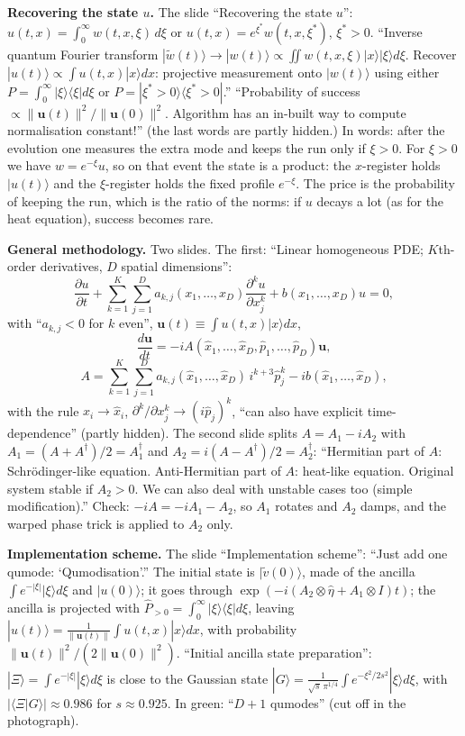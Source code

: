 \medskip\noindent
{\bf Recovering the state $u$.}
The slide ``Recovering the state $u$'':
$u(t,x)=\int_0^\infty w(t,x,\xi)\,d\xi$ or
$u(t,x)=e^{\xi^*}w(t,x,\xi^*)$, $\xi^*>0$.
``Inverse quantum Fourier transform
$|\tilde w(t)\rangle\to|w(t)\rangle\propto
\iint w(t,x,\xi)|x\rangle|\xi\rangle d\xi$.
Recover $|u(t)\rangle\propto\int u(t,x)
|x\rangle dx$: projective measurement onto
$|w(t)\rangle$ using either
$P=\int_0^\infty|\xi\rangle\langle\xi|d\xi$ or
$P=|\xi^*>0\rangle\langle\xi^*>0|$.''
``Probability of success $\propto\|\mathbf{u}
(t)\|^2/\|\mathbf{u}(0)\|^2$. Algorithm has an
in-built way to compute normalisation
constant!'' (the last words are partly hidden.)
In words: after the evolution one measures
the extra mode and keeps the run only if
$\xi>0$. For $\xi>0$ we have
$w=e^{-\xi}u$, so on that event the state is a
product: the $x$-register holds
$|u(t)\rangle$ and the $\xi$-register holds
the fixed profile $e^{-\xi}$. The price is the
probability of keeping the run, which is the
ratio of the norms: if $u$ decays a lot (as
for the heat equation), success becomes rare.

\medskip\noindent
{\bf General methodology.}
Two slides. The first: ``Linear homogeneous
PDE; $K$th-order derivatives, $D$ spatial
dimensions'':
$$
\frac{\partial u}{\partial t}
+\sum_{k=1}^K\sum_{j=1}^Da_{k,j}
(x_1,\dots,x_D)\frac{\partial^ku}
{\partial x_j^k}+b(x_1,\dots,x_D)u=0,
$$
with ``$a_{k,j}<0$ for $k$ even'',
$\mathbf{u}(t)\equiv\int u(t,x)|x\rangle dx$,
$$
\frac{d\mathbf{u}}{dt}=-iA(\hat x_1,\dots,
\hat x_D,\hat p_1,\dots,\hat p_D)\mathbf{u},
$$
$$
A=\sum_{k=1}^K\sum_{j=1}^Da_{k,j}
(\hat x_1,\dots,\hat x_D)\,i^{k+3}\hat p_j^k
-ib(\hat x_1,\dots,\hat x_D),
$$
with the rule $x_i\to\hat x_i$,
$\partial^k/\partial x_j^k\to(i\hat p_j)^k$,
``can also have explicit time-dependence''
(partly hidden). The second slide splits
$A=A_1-iA_2$ with
$A_1=(A+A^\dagger)/2=A_1^\dagger$ and
$A_2=i(A-A^\dagger)/2=A_2^\dagger$:
``Hermitian part of $A$: Schr\"odinger-like
equation. Anti-Hermitian part of $A$:
heat-like equation. Original system stable if
$A_2>0$. We can also deal with unstable
cases too (simple modification).''
Check: $-iA=-iA_1-A_2$, so $A_1$ rotates and
$A_2$ damps, and the warped phase trick is
applied to $A_2$ only.

\medskip\noindent
{\bf Implementation scheme.}
The slide ``Implementation scheme'': ``Just
add one qumode: `Qumodisation'.'' The initial
state is $|\tilde v(0)\rangle$, made of the
ancilla $\int e^{-|\xi|}|\xi\rangle d\xi$ and
$|u(0)\rangle$; it goes through
$\exp(-i(A_2\otimes\hat\eta+A_1\otimes I)t)$;
the ancilla is projected with
$\hat P_{>0}=\int_0^\infty|\xi\rangle\langle
\xi|d\xi$, leaving
$|u(t)\rangle=\frac{1}{\|\mathbf{u}(t)\|}\int
u(t,x)|x\rangle dx$, with probability
$\|\mathbf{u}(t)\|^2/(2\|\mathbf{u}(0)\|^2)$.
``Initial ancilla state preparation'':
$|\Xi\rangle=\int e^{-|\xi|}|\xi\rangle d\xi$
is close to the Gaussian state
$|G\rangle=\frac{1}{\sqrt s\,\pi^{1/4}}
\int e^{-\xi^2/2s^2}|\xi\rangle d\xi$, with
$|\langle\Xi|G\rangle|\approx0.986$ for
$s\approx0.925$. In green: ``$D+1$ qumodes''
(cut off in the photograph).

